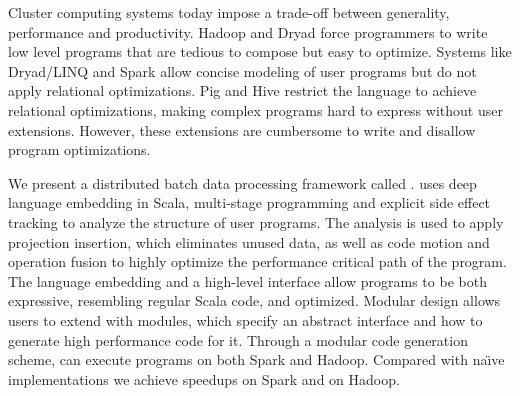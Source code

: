 Cluster computing systems today impose a trade-off between generality,
performance and productivity. Hadoop and Dryad force programmers to write low
level programs that are tedious to compose but easy to optimize. Systems like
Dryad/LINQ and Spark allow concise modeling of user programs but do not apply
relational optimizations. Pig and Hive restrict the language to achieve
relational optimizations, making complex programs hard to express without user
extensions. However, these extensions are cumbersome to write and disallow
program optimizations.

We present a distributed batch data processing framework called \tool.
\tool uses deep language embedding in Scala, multi-stage programming and explicit side effect
tracking to analyze the structure of user programs. The analysis is used to
apply projection insertion, which eliminates unused data, as well as code
motion and operation fusion to highly optimize the performance critical path of
the program. The language embedding and a high-level interface allow \tool
programs to be both expressive, resembling regular Scala code, and optimized.
Modular design allows users to extend \tool with modules, which specify an
abstract interface and how to generate high performance code for it. Through a
modular code generation scheme, \tool can execute programs on both Spark and
Hadoop. Compared with na\"{\i}ve implementations we achieve  speedups on
Spark and  on Hadoop.

